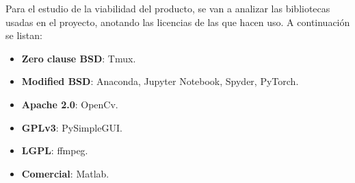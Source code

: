 Para el estudio de la viabilidad del producto, se van a analizar las bibliotecas 
usadas en el proyecto, anotando las licencias de las que hacen uso. A continuación se listan:

\begin{itemize}
\item \textbf {Zero clause BSD}: Tmux.
\item \textbf {Modified BSD}: Anaconda, Jupyter Notebook, Spyder, PyTorch.
\item \textbf {Apache 2.0}: OpenCv.
\item \textbf {GPLv3}: PySimpleGUI.
\item \textbf {LGPL}: ffmpeg.
\item \textbf {Comercial}: Matlab.
\end{itemize}
	




